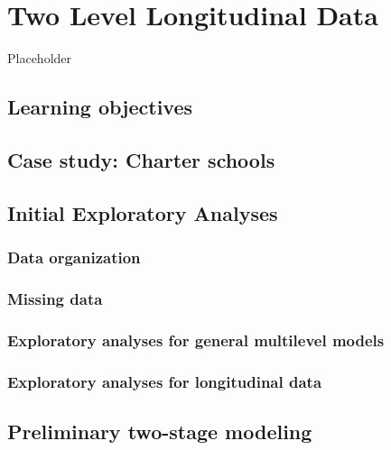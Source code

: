 \documentclass[
]{krantz}
\begin{document}
\hypertarget{ch-lon}{%
\chapter{Two Level Longitudinal Data}\label{ch-lon}}

Placeholder

\hypertarget{learning-objectives-8}{%
\section{Learning objectives}\label{learning-objectives-8}}

\hypertarget{cs:charter}{%
\section{Case study: Charter schools}\label{cs:charter}}

\hypertarget{exploratoryanalysis}{%
\section{Initial Exploratory Analyses}\label{exploratoryanalysis}}

\hypertarget{data}{%
\subsection{Data organization}\label{data}}

\hypertarget{missing}{%
\subsection{Missing data}\label{missing}}

\hypertarget{generalanalyses}{%
\subsection{Exploratory analyses for general multilevel models}\label{generalanalyses}}

\hypertarget{longitudinalanalyses}{%
\subsection{Exploratory analyses for longitudinal data}\label{longitudinalanalyses}}

\hypertarget{twostage9}{%
\section{Preliminary two-stage modeling}\label{twostage9}}
\end{document}
